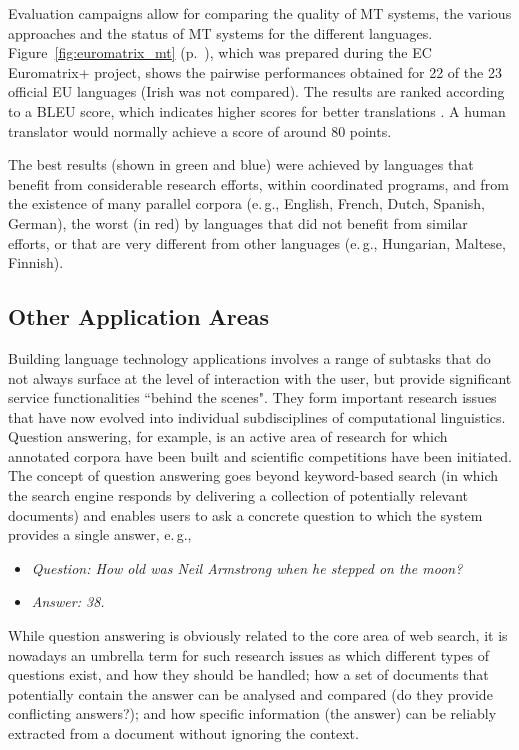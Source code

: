 \begin{multicols}{2}
Evaluation campaigns allow for comparing the quality of MT systems, the various approaches and the status of MT systems for the different languages. Figure~\ref{fig:euromatrix_mt} (p.~\pageref{fig:euromatrix_mt}), which was prepared during the EC Euromatrix+ project, shows the pairwise performances obtained for 22 of the 23 official EU languages (Irish was not compared). The results are ranked according to a BLEU score, which indicates higher scores for better translations \cite{bleu1}. A human translator would normally achieve a score of around 80 points.

The best results (shown in green and blue) were achieved by languages that benefit from considerable research efforts, within coordinated programs, and from the existence of many parallel corpora (e.\,g., English, French, Dutch, Spanish, German), the worst (in red) by languages that did not benefit from similar efforts, or that are very different from other languages (e.\,g., Hungarian, Maltese, Finnish).

\subsection{Other Application Areas}

Building language technology applications involves a range of subtasks that do not always surface at the level of interaction with the user, but provide significant service functionalities ``behind the scenes". They form important research issues that have now evolved into individual subdisciplines of computational linguistics. Question answering, for example, is an active area of research for which annotated corpora have been built and scientific competitions have been initiated. The concept of question answering goes beyond keyword-based search (in which the search engine responds by delivering a collection of potentially relevant documents) and enables users to ask a concrete question to which the system provides a single answer, e.\,g.,

\begin{itemize}
\item[] \textit{Question: How old was Neil Armstrong when he stepped on the moon?}
\item[] \textit{Answer: 38.}
\end{itemize}

While question answering is obviously related to the core area of web search, it is nowadays an umbrella term for such research issues as which different types of questions exist, and how they should be handled; how a set of documents that potentially contain the answer can be analysed and compared (do they provide conflicting answers?); and how specific information (the answer) can be reliably extracted from a document without ignoring the context. 


\end{multicols}
